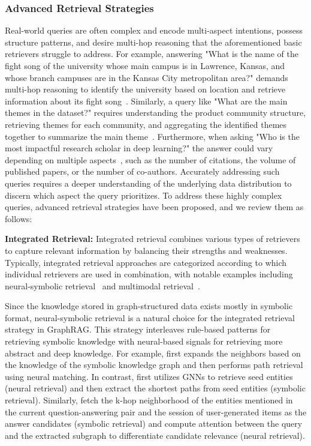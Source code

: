 \subsubsection{Advanced Retrieval Strategies}
Real-world queries are often complex and encode multi-aspect intentions, possess structure patterns, and desire multi-hop reasoning that the aforementioned basic retrievers struggle to address. For example, answering "What is the name of the fight song of the university whose main campus is in Lawrence, Kansas, and whose branch campuses are in the Kansas City metropolitan area?" demands multi-hop reasoning to identify the university based on location and retrieve information about its fight song~\cite{he2024make, trivedi2022interleaving}. Similarly, a query like "What are the main themes in the dataset?" requires understanding the product community structure, retrieving themes for each community, and aggregating the identified themes together to summarize the main theme~\cite{edge2024local}. Furthermore, when asking "Who is the most impactful research scholar in deep learning?" the answer could vary depending on multiple aspects~\cite{zhang2023pre}, such as the number of citations, the volume of published papers, or the number of co-authors. Accurately addressing such queries requires a deeper understanding of the underlying data distribution to discern which aspect the query prioritizes. To address these highly complex queries, advanced retrieval strategies have been proposed, and we review them as follows:



\textbf{Integrated Retrieval:} Integrated retrieval combines various types of retrievers to capture relevant information by balancing their strengths and weaknesses. Typically, integrated retrieval approaches are categorized according to which individual retrievers are used in combination, with notable examples including neural-symbolic retrieval~\cite{dietz2023neuro, lee2024diakop, wang2024knowledge} and multimodal retrieval~\cite{cui2024more, long2024generative}. 

Since the knowledge stored in graph-structured data exists mostly in symbolic format, neural-symbolic retrieval is a natural choice for the integrated retrieval strategy in GraphRAG. This strategy interleaves rule-based patterns for retrieving symbolic knowledge with neural-based signals for retrieving more abstract and deep knowledge. For example, \citet{luo2023reasoning, wen2023mindmap} first expands the neighbors based on the knowledge of the symbolic knowledge graph and then performs path retrieval using neural matching. In contrast, \citet{mavromatis2024gnn} first utilizes GNNs to retrieve seed entities (neural retrieval) and then extract the shortest paths from seed entities (symbolic retrieval). Similarly, \citet{tian2024graph, yasunaga2021qa, yasunaga2022deep, wang2024knowledge2, luo2023reasoning} fetch the k-hop neighborhood of the entities mentioned in the current question-answering pair and the session of user-generated items as the answer candidates (symbolic retrieval) and compute attention between the query and the extracted subgraph to differentiate candidate relevance (neural retrieval).


